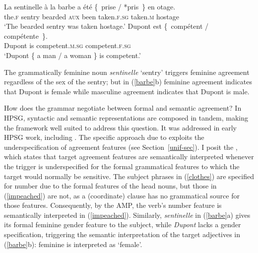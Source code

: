 \documentclass[output=paper,biblatex,babelshorthands,newtxmath,draftmode,colorlinks,citecolor=brown]{langscibook}
\begin{document}
\begin{exe} 
\ex \label{barbe}
 \begin{xlist}
\ex   
\gll La             sentinelle {\`{a} la barbe} a            \'{e}t\'{e} \{~prise                          /  *pris~\} 	                 {en otage}.  \\
     the.\textsc{f} sentry     bearded          \textsc{aux} been        \hphantom{\{~}taken.\textsc{f.sg} {} \hphantom{*}taken.\textsc{m} hostage \\
\glt `The bearded sentry was taken hostage.’
\ex   
\gll Dupont est	\{~comp\'{e}tent                      /	comp\'{e}tente~\}. \\
     Dupont is	\hphantom{\{~}competent.\textsc{m.sg} {}	competent.\textsc{f.sg}\\
\glt `Dupont \{ a man / a woman \} is competent.’
 \end{xlist}
\end{exe} 

\noindent
The grammatically feminine noun \textit{sentinelle} `sentry'  triggers feminine agreement regardless of the sex of the sentry; but in (\ref{barbe}b) feminine agreement indicates that Dupont is female while masculine agreement indicates that Dupont is male.  

How does the grammar negotiate between formal and semantic agreement?  In HPSG, syntactic and semantic representations are composed in tandem, making the framework well suited to address this question.   It was addressed in early HPSG work, including .   The specific approach due to  exploits the underspecification of agreement features (see Section~\ref{unif-sec}).  I posit the , which states that target agreement features are semantically interpreted whenever the trigger is underspecified for the formal grammatical features to which the target would normally be sensitive.   The subject phrases in (\ref{clothes}) are specified for number due to the formal features of the head nouns, but those in (\ref{impeached}) are not, as a (coordinate) clause has no grammatical source for those features.  Consequently, by the AMP, the verb's number feature is semantically interpreted in (\ref{impeached}).  Similarly, \textit{sentinelle} in (\ref{barbe}a) gives its formal feminine gender feature to the subject, while \textit{Dupont} lacks a gender specification, triggering the semantic interpretation of the target adjectives in (\ref{barbe}b): feminine is interpreted as `female'.    
\end{document}
